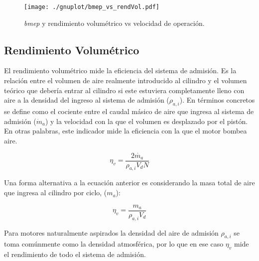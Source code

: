 \begin{figure} \centering
\texttt{[image: ./gnuplot/bmep\_vs\_rendVol.pdf]}
    \caption{\emph{bmep} y rendimiento volumétrico vs velocidad de operación.}
    \label{fig:bmep_tipica}
\end{figure}



\subsection{Rendimiento Volumétrico}
%
El rendimiento volumétrico mide la eficiencia del sistema de admisión.
%
Es la relación entre el volumen de aire realmente introducido al cilindro y el
volumen teórico que debería entrar al cilindro si este estuviera completamente
lleno con aire a la densidad del ingreso al sistema de admisión ($\rho_{a,i}$).
%
En términos concretos se define como el cociente entre el caudal másico de aire
que ingresa al sistema de admisión ($\dot{m}_{a}$) y la velocidad con la que el
volumen es desplazado por el pistón.
%
En otras palabras, este indicador mide la eficiencia con la que el motor bombea
aire.

\begin{equation}\label{eq:eta_v}
  \eta_v = \frac{2\dot{m_a}}{\rho_{a,i}V_d N}
\end{equation}


Una forma alternativa a la ecuación anterior es considerando la masa total de aire que
ingresa al cilindro por ciclo, ($m_{a}$):

\begin{equation}\label{eq:eta_v_alt}
  \eta_v = \frac{m_a}{\rho_{a,i}V_d}
\end{equation}

Para motores naturalmente aspirados la densidad del aire de admisión
$\rho_{a,i}$ se toma comúnmente como la densidad atmosférica, por lo que en ese
caso $\eta_v$ mide el rendimiento de todo el sistema de admisión.
%

